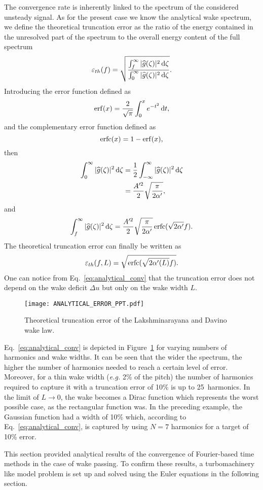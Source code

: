 The convergence rate is inherently linked to
the spectrum of the considered unsteady signal.
As for the present case we know the analytical wake spectrum,
we define the theoretical truncation error as the ratio of
the energy contained in the unresolved part 
of the spectrum to the overall energy content of the full spectrum
\begin{equation}
    \varepsilon_{th}(f) = \sqrt{\frac{
        \int_f^\infty | \widehat{g}(\zeta)|^2 \diff \zeta
      }{
        \int_0^\infty | \widehat{g}(\zeta)|^2 \diff \zeta
      }}.
    \label{eq:def_truncation_error}
\end{equation}
Introducing the error function defined as
\begin{equation}
    \operatorname{erf}(x) = \frac{2}{\sqrt{\pi}} \int_0^x e^{-t^2} \mathop{}\!\mathrm{d} t,
\end{equation}
and the complementary error function defined as
\begin{equation}
    \operatorname{erfc}(x) = 1 - \operatorname{erf}(x),
\end{equation}
then
\begin{align}
    \int_0^\infty | \widehat{g}(\zeta)|^2 \mathop{}\!\mathrm{d} \zeta 
    &= \frac{1}{2} \int_{- \infty}^\infty | \widehat{g}(\zeta)|^2 \mathop{}\!\mathrm{d} \zeta \\
    &= \frac{A^{\prime 2}}{2} \sqrt{\frac{\pi}{2 \alpha^\prime}},
\end{align}
and
\begin{equation}
    \int_f^\infty | \widehat{g}(\zeta)|^2 \mathop{}\!\mathrm{d} \zeta = 
      \frac{A^{\prime 2}}{2} \sqrt{\frac{\pi}{2 \alpha^\prime}} \operatorname{erfc} (\sqrt{2 \alpha^\prime} f).
\end{equation}
The theoretical truncation error can finally be written as
\begin{equation}
    \varepsilon_{th}(f, L) = \sqrt{\erfc (\sqrt{2 \alpha^\prime(L) } f)}.
    \label{eq:analytical_conv}
\end{equation}
One can notice from Eq.~\eqref{eq:analytical_conv} that the 
truncation error does not depend on the wake deficit $\Delta u$ 
but only on the wake width $L$. 

\begin{figure}[htp]
    \centering\texttt{[image: ANALYTICAL\_ERROR\_PPT.pdf]}
  \caption{Theoretical truncation error of the Lakshminarayana and Davino wake law.}
  \label{fig:analytic_error_paper}
\end{figure}
Eq.~\eqref{eq:analytical_conv} is depicted in
Figure~\ref{fig:analytic_error_paper} for varying
numbers of harmonics and wake widths.
It can be seen that the wider the spectrum,
the higher the number of harmonics needed to
reach a certain level of error. 
Moreover, for a thin wake width (\emph{e.g.} 2\% of the pitch)
the number of harmonics required to capture it with a truncation 
error of 10\% is up to 25~harmonics.
In the limit of $L \to 0$, the wake becomes a Dirac function
which represents the worst possible case, as the rectangular
function was.
In the preceding example, the Gaussian function had a width
of 10\% which, according to Eq.~\eqref{eq:analytical_conv},
is captured by using $N=7$ harmonics for a target of 10\% error.

This section provided analytical results of the
convergence of Fourier-based time methods 
in the case of wake passing. To confirm these results,
a turbomachinery like model problem
is set up and solved using the Euler equations in
the following section.



